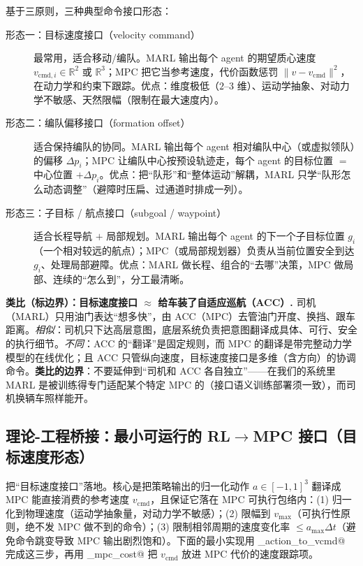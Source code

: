 基于三原则，三种典型命令接口形态：
\begin{description}
  \item[形态一：目标速度接口（velocity command）] 最常用，适合移动/编队。MARL 输出每个 agent 的期望质心速度 $v_{\text{cmd},i}\in\mathbb{R}^{2}$ 或 $\mathbb{R}^{3}$；MPC 把它当参考速度，代价函数惩罚 $\|v-v_{\text{cmd}}\|^2$，在动力学和约束下跟踪。优点：维度极低（$2$--$3$ 维）、运动学抽象、对动力学不敏感、天然限幅（限制在最大速度内）。
  \item[形态二：编队偏移接口（formation offset）] 适合保持编队的协同。MARL 输出每个 agent 相对编队中心（或虚拟领队）的偏移 $\Delta p_i$；MPC 让编队中心按预设轨迹走，每个 agent 的目标位置 $=$ 中心位置 $+\Delta p_i$。优点：把“队形”和“整体运动”解耦，MARL 只学“队形怎么动态调整”（避障时压扁、过通道时排成一列）。
  \item[形态三：子目标 / 航点接口（subgoal / waypoint）] 适合长程导航 $+$ 局部规划。MARL 输出每个 agent 的下一个子目标位置 $g_i$（一个相对较远的航点）；MPC（或局部规划器）负责从当前位置安全到达 $g_i$、处理局部避障。优点：MARL 做长程、组合的“去哪”决策，MPC 做局部、连续的“怎么到”，分工最清晰。
\end{description}

\begin{note}
\textbf{类比（标边界）：目标速度接口 $\approx$ 给车装了自适应巡航（ACC）.}\;
司机（MARL）只用油门表达“想多快”，由 ACC（MPC）去管油门开度、换挡、跟车距离。\emph{相似}：司机只下达高层意图，底层系统负责把意图翻译成具体、可行、安全的执行细节。\emph{不同}：ACC 的“翻译”是固定规则，而 MPC 的翻译是带完整动力学模型的在线优化；且 ACC 只管纵向速度，目标速度接口是多维（含方向）的协调命令。\textbf{类比的边界}：不要延伸到“司机和 ACC 各自独立”——在我们的系统里 MARL 是被训练得专门适配某个特定 MPC 的（接口语义训练部署须一致），而司机换辆车照样能开。
\end{note}

\subsection{理论-工程桥接：最小可运行的 RL\texorpdfstring{$\to$}{->}MPC 接口（目标速度形态）}
\label{sec:mh-iface-code}

把“目标速度接口”落地。核心是把策略输出的归一化动作 $a\in[-1,1]^3$ 翻译成 MPC 能直接消费的参考速度 $v_{\text{cmd}}$，且保证它落在 MPC 可执行包络内：(1) 归一化到物理速度（运动学抽象量，对动力学不敏感）；(2) 限幅到 $v_{\max}$（可执行性原则，绝不发 MPC 做不到的命令）；(3) 限制相邻周期的速度变化率 $\le a_{\max}\Delta t$（避免命令跳变导致 MPC 输出剧烈饱和）。下面的最小实现用 \verb@policy_action_to_vcmd@ 完成这三步，再用 \verb@build_mpc_cost@ 把 $v_{\text{cmd}}$ 放进 MPC 代价的速度跟踪项。

